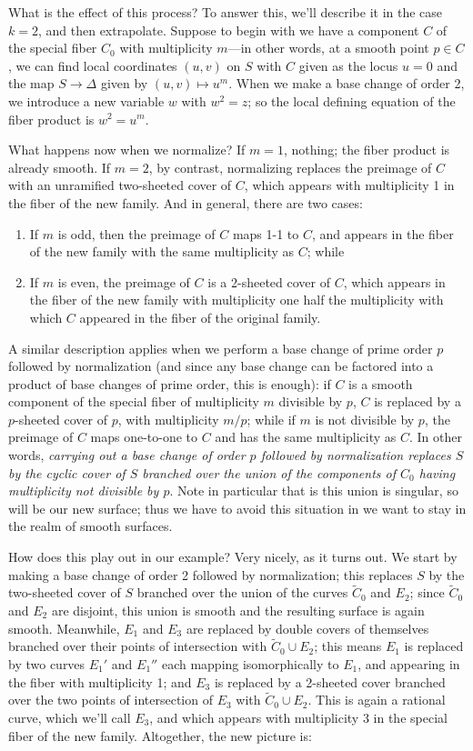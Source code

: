What is the effect of this process? To answer this, we'll describe it in the case $k=2$, and then extrapolate. Suppose to begin with we have a component $C$ of the special fiber $C_0$ with multiplicity $m$---in other words, at a smooth point $p \in C$, we can find local coordinates $(u,v)$ on $S$ with $C$ given as the locus $u=0$ and the map $S \to \Delta$ given by $(u,v) \mapsto u^m$. When we make a base change of order 2, we introduce a new variable $w$ with $w^2 = z$; so the local defining equation of the fiber product is $w^2 = u^m$.

What happens now when we normalize? If $m = 1$, nothing; the fiber product is already smooth. If $m=2$, by contrast, normalizing replaces the preimage of $C$ with an unramified two-sheeted cover of $C$, which appears with multiplicity 1 in the fiber of the new family. And in general, there are two cases:
\begin{enumerate}
\item If $m$ is odd, then the preimage of $C$ maps 1-1 to $C$, and appears in the fiber of the new family with the same multiplicity as $C$; while
\item If $m$ is even, the preimage of $C$ is a 2-sheeted cover of $C$, which appears in the fiber of the new family with multiplicity one half the multiplicity with which $C$ appeared in the fiber of the original family.
\end{enumerate}

A similar description applies when we perform a base change of prime order $p$ followed by normalization (and since any base change can be factored into a product of base changes of prime order, this is enough): if $C$ is a smooth component of the special fiber of multiplicity $m$ divisible by $p$, $C$ is replaced by a $p$-sheeted cover of $p$, with multiplicity $m/p$; while if $m$ is not divisible by $p$, the preimage of $C$ maps one-to-one to $C$ and has the same multiplicity as $C$. In other words, \emph{carrying out a base change of order $p$ followed by normalization replaces $S$ by the cyclic cover of $S$ branched over the union of the components of $C_0$ having multiplicity not divisible by $p$}. Note in particular that is this union is singular, so will be our new surface; thus we have to avoid this situation in we want to stay in the realm of smooth surfaces.

How does this play out in our example? Very nicely, as it turns out. We start by making a base change of order 2 followed by normalization; this replaces $S$ by the two-sheeted cover of $S$ branched over the union of the curves $\tilde C_0$ and $E_2$; since $\tilde C_0$ and $E_2$ are disjoint, this union is smooth and the resulting surface is again smooth. Meanwhile, $E_1$ and $E_3$ are replaced by double covers of themselves branched over their points of intersection with $\tilde C_0 \cup E_2$; this means $E_1$ is replaced by two curves $E_1'$ and $E_1''$ each mapping isomorphically to $E_1$, and appearing in the fiber with multiplicity 1; and $E_3$ is replaced by a 2-sheeted cover branched over the two points of intersection of $E_3$ with $\tilde C_0 \cup E_2$. This is again a rational curve, which we'll call $E_3$, and which appears with multiplicity 3 in the special fiber of the new family. Altogether, the new picture is:

